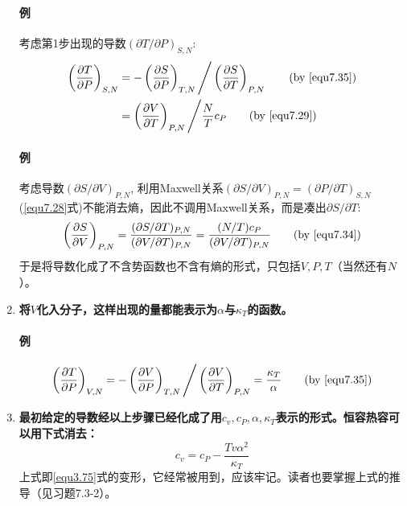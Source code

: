 \begin{enumerate}
\paragraph{例} 考虑第1步出现的导数$(\partial T / \partial P)_{S, N}$:
\begin{align}
	\left( \frac{\partial T}{\partial P} \right)_{S, N} &= - \left( \frac{\partial S}{\partial P} \right)_{T, N} \Bigg/ \left( \frac{\partial S}{\partial T} \right)_{P, N} \tag{by \eqref{equ7.35}} \\
	&= \left( \frac{\partial V}{\partial T} \right)_{P, N} \Bigg/ \frac{N}{T} c_P \tag{by \eqref{equ7.29}}
\end{align}

\paragraph{例} 考虑导数$(\partial S / \partial V)_{P, N}$, 利用Maxwell关系$(\partial S / \partial V)_{P, N} = (\partial P / \partial T)_{S, N}$ (\eqref{equ7.28}式)不能消去熵，因此不调用Maxwell关系，而是凑出$\partial S / \partial T$:
\begin{equation}
	\left( \frac{\partial S}{\partial V} \right)_{P, N} = \frac{(\partial S / \partial T)_{P, N}}{(\partial V / \partial T)_{P, N}} = \frac{(N / T) c_P}{(\partial V / \partial T)_{P, N}} \tag{by \eqref{equ7.34}}
\end{equation}
于是将导数化成了不含势函数也不含有熵的形式，只包括$V, P, T$（当然还有$N$）。
\item {\bf 将$V$化入分子，这样出现的量都能表示为$\alpha$与$\kappa_T$的函数。}

\paragraph{例} \begin{equation}
	\left( \frac{\partial T}{\partial P} \right)_{V, N} = -\left( \frac{\partial V}{\partial P} \right)_{T, N} \Bigg/ \left( \frac{\partial V}{\partial T} \right)_{P, N} = \frac{\kappa_T}{\alpha} \tag{by \eqref{equ7.35}}
\end{equation}

\item {\bf 最初给定的导数经以上步骤已经化成了用$c_v, c_P, \alpha, \kappa_T$表示的形式。恒容热容可以用下式消去：}
\begin{equation}
	c_v = c_P - \frac{Tv\alpha^2}{\kappa_T}
\label{equ7.36}
\end{equation}
上式即\eqref{equ3.75}式的变形，它经常被用到，应该牢记。读者也要掌握上式的推导（见习题7.3-2）。
\end{enumerate}

